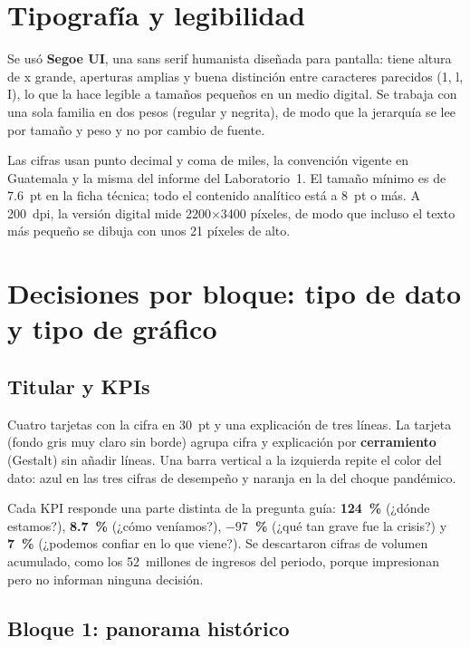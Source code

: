 \documentclass[12pt,letterpaper]{article}
\begin{document}
\section{Tipografía y legibilidad}

Se usó \textbf{Segoe UI}, una sans serif humanista diseñada para pantalla: tiene altura de x
grande, aperturas amplias y buena distinción entre caracteres parecidos (1, l, I), lo que la hace
legible a tamaños pequeños en un medio digital. Se trabaja con una sola familia en dos pesos
(regular y negrita), de modo que la jerarquía se lee por tamaño y peso y no por cambio de fuente.

Las cifras usan punto decimal y coma de miles, la convención vigente en Guatemala y la misma del
informe del Laboratorio~1. El tamaño mínimo es de 7.6~pt en la ficha técnica; todo el contenido
analítico está a 8~pt o más. A 200~dpi, la versión digital mide 2200$\times$3400 píxeles, de modo
que incluso el texto más pequeño se dibuja con unos 21 píxeles de alto.

\section{Decisiones por bloque: tipo de dato y tipo de gráfico}

\subsection{Titular y KPIs}

Cuatro tarjetas con la cifra en 30~pt y una explicación de tres líneas. La tarjeta (fondo gris
muy claro sin borde) agrupa cifra y explicación por \textbf{cerramiento} (Gestalt) sin añadir
líneas. Una barra vertical a la izquierda repite el color del dato: azul en las tres cifras de
desempeño y naranja en la del choque pandémico.

Cada KPI responde una parte distinta de la pregunta guía: \textbf{124~\%} (¿dónde estamos?),
\textbf{8.7~\%} (¿cómo veníamos?), \textbf{$-97$~\%} (¿qué tan grave fue la crisis?) y
\textbf{7~\%} (¿podemos confiar en lo que viene?). Se descartaron cifras de volumen acumulado,
como los 52~millones de ingresos del periodo, porque impresionan pero no informan ninguna
decisión.

\subsection{Bloque 1: panorama histórico}
\end{document}
